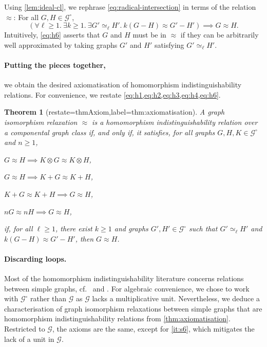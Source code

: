 \documentclass[11pt]{scrartcl}
\theoremstyle{definition}
\theoremstyle{plain}
\newtheorem{theorem}[definition]{Theorem}
\theoremstyle{remark}
\newcommand{\lG}{\mathcal{G}^\circ}
\newcommand{\G}{\mathcal{G}}
\begin{document}
	Using \cref{lem:ideal-cl},
	we rephrase \cref{eq:radical-intersection} in terms of the relation $\approx$:
	For all $G, H \in \lG$,
	\begin{equation}\label{eq:h6}
		\left( \forall \ell \geq 1.\ \exists k \geq 1.\  \exists G' \simeq_\ell H'.\  k(G-H) \approx G' - H' \right) \implies G \approx H.
	\end{equation}
	Intuitively, \eqref{eq:h6} asserts that $G$ and $H$ must be in $\approx$ if they can be arbitrarily well approximated by taking graphs $G'$ and $H'$ satisfying $G' \simeq_\ell H'$. 
	
	\paragraph{Putting the pieces together, } 
	we obtain the desired axiomatisation of homomorphism indistinguishability relations.
	For convenience, we restate \cref{eq:h1,eq:h2,eq:h3,eq:h4,eq:h6}.
	\begin{theorem}[restate=thmAxiom,label=thm:axiomatisation]
		A graph isomorphism relaxation $\approx$ is a homomorphism indistinguishability relation over a componental graph class if, and only if, it satisfies, for all graphs $G, H, K \in \lG$ and $n \geq 1$,
		\begin{assertions}
			\item\label{it:a1} $G \approx H \implies K \otimes G \approx K \otimes H$,
			\item\label{it:a2} $G \approx H \implies K + G \approx K + H$,
			\item\label{it:a3} $K + G \approx K + H \implies G \approx H$,
			\item\label{it:a4} $nG \approx nH \implies G \approx H$, 
\item\label{it:a5} if, for all $\ell \geq 1$, there exist $k \geq 1$ and graphs $G', H' \in \lG$ such that $G' \simeq_\ell H'$ and $k(G-H) \approx G' - H'$, then $G \approx H$.
		\end{assertions}
	\end{theorem}

    \paragraph{Discarding loops.}
    Most of the homomorphism indistinguishability literature concerns relations between simple graphs, cf.\ \cite[Section~7]{roberson_oddomorphisms_2022} and \cite[p.~32]{seppelt_homomorphism_2024}. 
    For algebraic convenience, we chose to work with $\lG$ rather than $\G$ as $\G$ lacks a multiplicative unit. 
    Nevertheless, we deduce a characterisation of graph isomorphism relaxations between simple graphs that are homomorphism indistinguishability relations from \cref{thm:axiomatisation}.
    Restricted to $\G$, the axioms are the same, except for \cref{it:s6}, which  mitigates the lack of a unit in $\G$.
    
\end{document}
